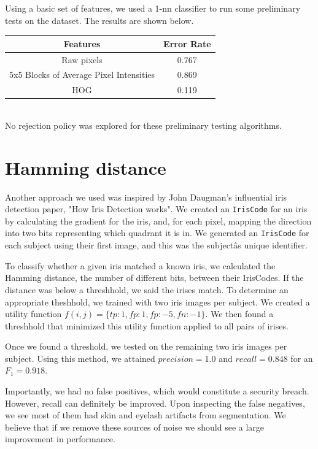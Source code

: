 \documentclass[12pt]{article}
\begin{document}
Using a basic set of features, we used a 1-nn classifier to run some preliminary tests on the dataset. The results are shown below.\\

\begin{tabular}{| c | c |}
\hline
Features & Error Rate\\
\hline
Raw pixels & 0.767 \\
\hline
5x5 Blocks of Average Pixel Intensities & 0.869 \\
\hline
HOG & 0.119 \\ 
\hline
\end{tabular}\\

No rejection policy was explored for these preliminary testing algorithms.
\section{Hamming distance}
\label{sec:hamming}

Another approach we used was inspired by John Daugman's influential iris detection paper, "How Iris Detection works". \cite{daugman}  We created an {\tt IrisCode} for an iris by calculating the gradient for the iris, and, for each pixel, mapping the direction into two bits representing which quadrant it is in.  We generated an {\tt IrisCode} for each subject using their first image, and this was the subjectâs unique identifier.

To classify whether a given iris matched a known iris, we calculated the Hamming distance, the number of different bits, between their IrisCodes.  If the distance was below a threshhold, we said the irises match.  To determine an appropriate theshhold, we trained with two iris images per subject. We created a utility function $f(i,j) = \{tp:1, fp:1, fp: -5, fn:-1\}$.  We then found a threshhold that minimized this utility function applied to all pairs of irises.

Once we found a threshold, we tested on the remaining two iris images per subject. Using this method, we attained $precision=1.0$ and $recall=0.848$ for an $F_1=0.918$.  

Importantly, we had no false positives, which would constitute a security breach.  However, recall can definitely be improved.  Upon inspecting the false negatives, we see most of them had skin and eyelash artifacts from segmentation.  We believe that if we remove these sources of noise we should see a large improvement in performance.
\end{document}
